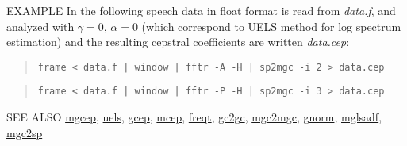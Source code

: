 \begin{qsection}{EXAMPLE}
In the following speech data in float format is read
from {\em data.f}, and analyzed with $\gamma=0$, $\alpha=0$
(which correspond to UELS method for log spectrum estimation)
and the resulting cepstral coefficients are written {\em data.cep}:
\begin{quote}
  \verb!frame < data.f | window | fftr -A -H | sp2mgc -i 2 > data.cep !
\end{quote}
\begin{quote}
  \verb!frame < data.f | window | fftr -P -H | sp2mgc -i 3 > data.cep !
\end{quote}
\end{qsection}

\begin{qsection}{SEE ALSO}
\hyperlink{mgcep}{mgcep},
\hyperlink{uels}{uels},
\hyperlink{gcep}{gcep},
\hyperlink{mcep}{mcep},
\hyperlink{freqt}{freqt},
\hyperlink{gc2gc}{gc2gc},
\hyperlink{mgc2mgc}{mgc2mgc},
\hyperlink{gnorm}{gnorm},
\hyperlink{mglsadf}{mglsadf},
\hyperlink{mgc2sp}{mgc2sp}
\end{qsection}
